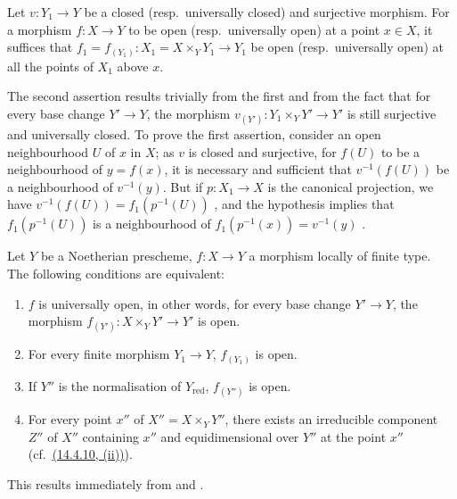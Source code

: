\begin{lemma}[14.4.8.1]
\label{IV.14.4.8.1}
Let $v:Y_1\to Y$ be a closed (resp.\ universally closed) and surjective morphism.
For a morphism $f:X\to Y$ to be open (resp.\ universally open) at a point $x\in X$, it suffices that $f_1=f_{(Y_1)}:X_1=X\times_Y Y_1\to Y_1$ be open (resp.\ universally open) at all the points of $X_1$ above $x$.
\end{lemma}

The second assertion results trivially from the first and from the fact that for every base change $Y'\to Y$, the morphism $v_{(Y')}:Y_1\times_Y Y'\to Y'$ is still surjective and universally closed.
To prove the first assertion, consider
an open neighbourhood $U$ of $x$ in $X$; as $v$ is closed and surjective, for $f(U)$ to be a neighbourhood of $y=f(x)$, it is necessary and sufficient that $v^{-1}(f(U))$ be a neighbourhood of $v^{-1}(y)$.
But if $p:X_1\to X$ is the canonical projection, we have $v^{-1}(f(U))=f_1(p^{-1}(U))$ , and the hypothesis implies that $f_1(p^{-1}(U))$ is a neighbourhood of $f_1(p^{-1}(x))=v^{-1}(y)$ .

\begin{corollary}[14.4.9]
\label{IV.14.4.9}
Let $Y$ be a Noetherian prescheme, $f:X\to Y$ a morphism locally of finite type.
The following conditions are equivalent:
\begin{enumerate}[label=\emph{\alph*)}]
  \item $f$ is universally open, in other words, for every base change $Y'\to Y$, the morphism $f_{(Y')}:X\times_Y Y'\to Y'$ is open.
  \item[\emph{a$'$)}] For every finite morphism $Y_1\to Y$, $f_{(Y_1)}$ is open.
  \item[\emph{a$''$)}] If $Y''$ is the normalisation of $Y_{\mathrm{red}}$, $f_{(Y'')}$ is open.
  \item For every point $x''$ of $X''=X\times_Y Y''$, there exists an irreducible component $Z''$ of $X''$ containing $x''$ and equidimensional over $Y''$ at the point $x''$ (cf.\ {\hyperref[IV.14.4.10]{(14.4.10, (ii))}}).
\end{enumerate}
\end{corollary}

This results immediately from  and .

